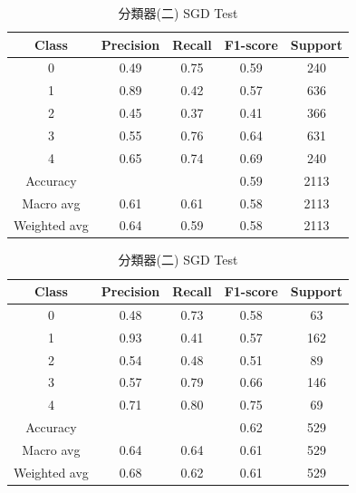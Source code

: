 \begin{enumerate}
\begin{enumerate}
                \begin{table}[H]
                \centering
                \scriptsize
                \begin{minipage}{0.48\textwidth}
                \centering
                \begin{tabular}{c|cccc}
                \hline
                Class & Precision & Recall & F1-score & Support \\
                \hline
                0 & 0.49 & 0.75 & 0.59 & 240 \\
                1 & 0.89 & 0.42 & 0.57 & 636 \\
                2 & 0.45 & 0.37 & 0.41 & 366 \\
                3 & 0.55 & 0.76 & 0.64 & 631 \\
                4 & 0.65 & 0.74 & 0.69 & 240 \\
                \hline
                Accuracy &       &       & 0.59 & 2113 \\
                Macro avg & 0.61 & 0.61 & 0.58 & 2113 \\
                Weighted avg & 0.64 & 0.59 & 0.58 & 2113 \\
                \hline
                \end{tabular}
                \caption{分類器(二) SGD Train}
                \label{tab:classifier_2_report_train_rf_sgd_filtered}
                \end{minipage}%
                \hfill
                \begin{minipage}{0.48\textwidth}
                \centering
                \begin{tabular}{c|cccc}
                \hline
                Class & Precision & Recall & F1-score & Support \\
                \hline
                0 & 0.48 & 0.73 & 0.58 & 63 \\
                1 & 0.93 & 0.41 & 0.57 & 162 \\
                2 & 0.54 & 0.48 & 0.51 & 89 \\
                3 & 0.57 & 0.79 & 0.66 & 146 \\
                4 & 0.71 & 0.80 & 0.75 & 69 \\
                \hline
                Accuracy &       &       & 0.62 & 529 \\
                Macro avg & 0.64 & 0.64 & 0.61 & 529 \\
                Weighted avg & 0.68 & 0.62 & 0.61 & 529 \\
                \hline
                \end{tabular}
                \caption{分類器(二) SGD Test}
                \label{tab:classifier_2_report_test_rf_sgd_filtered}
                \end{minipage}
                \end{table}


\end{enumerate}
\end{enumerate}
